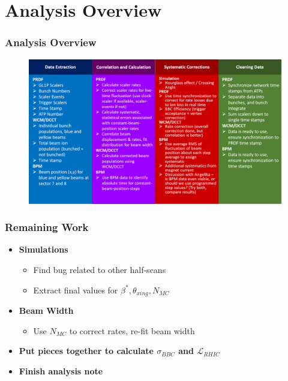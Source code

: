 \section{Analysis Overview}
\label{sec:analysis_overview}

\begin{frame}
  \frametitle{Analysis Overview}
  \begin{figure}
    \includegraphics[width=\linewidth]{"./figures/analysis_map_wide"}
  \end{figure}
\end{frame}

\begin{frame}
  \frametitle{Remaining Work}
  \begin{itemize}
    \item \textbf{Simulations}
      \begin{itemize}
        \item Find bug related to other half-scans
        \item Extract final values for $\beta^*, \theta_{xing}, N_{MC}$
      \end{itemize}
    \item \textbf{Beam Width}
      \begin{itemize}
        \item Use $N_{MC}$ to correct rates, re-fit beam width
      \end{itemize}
    \item \textbf{Put pieces together to calculate $\sigma_{BBC}$ and
      $\mathcal{L}_{RHIC}$}
    \item \textbf{Finish analysis note}
  \end{itemize}
\end{frame}

